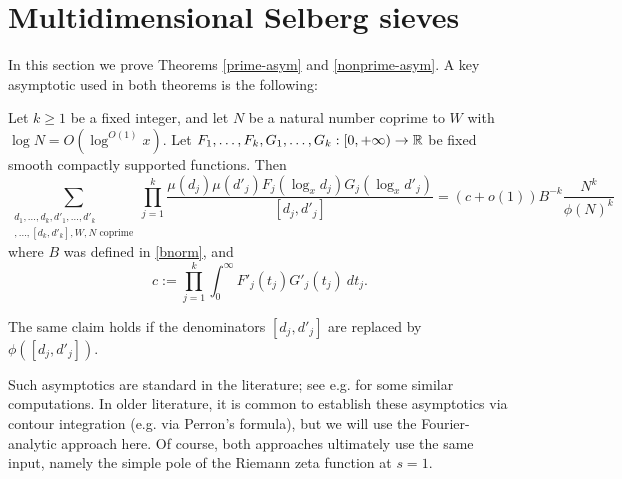 
\section{Multidimensional Selberg sieves}\label{sieving-sec}

In this section we prove Theorems \ref{prime-asym} and \ref{nonprime-asym}.  A key asymptotic used in both theorems is the following:

\begin{lemma}[Asymptotic]\label{mul-asym}  Let $k \geq 1$ be a fixed integer,
 and let $N$ be a natural number coprime to $W$ with $\log{N}=O(\log^{O(1)}{x})$. Let $F_1,\dots,F_k,G_1,\dots,G_k: [0,+\infty)\to \mathbb{R}$ be fixed smooth compactly supported functions.  Then
\begin{equation}\label{multisum}
 \sum_{\substack{d_1,\dots,d_k,d'_1,\dots,d'_k \\ [d_1,d'_1],\dots,[d_k,d'_k], W, N \text{ coprime}}} \prod_{j=1}^k \frac{\mu(d_j) \mu(d'_j) F_j( \log_x d_j ) G_j( \log_x d'_j)}{[d_j,d'_j]} = (c+o(1)) B^{-k}\frac{N^k}{\phi(N)^k}
\end{equation}
where $B$ was defined in \eqref{bnorm}, and
$$ c := \prod_{j=1}^k \int_0^\infty F'_j(t_j) G'_j(t_j)\ dt_j.$$

The same claim holds if the denominators $[d_j,d'_j]$ are replaced by $\phi([d_j,d'_j])$.
\end{lemma}

Such asymptotics are standard in the literature; see e.g. \cite{gy} for some similar computations.  In older literature, it is common to establish these asymptotics via contour integration (e.g. via Perron's formula), but we will use the Fourier-analytic approach here.  Of course, both approaches ultimately use the same input, namely the simple pole of the Riemann zeta function at $s=1$. 


